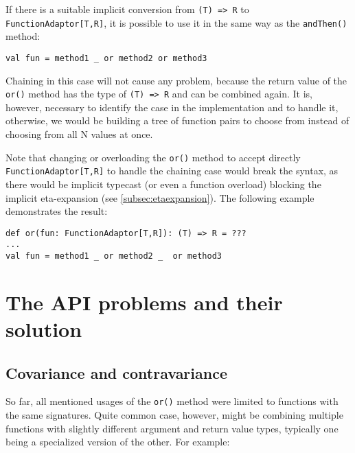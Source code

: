 If there is a suitable implicit conversion from \lstinline|(T) => R| to \lstinline|FunctionAdaptor[T,R]|, it is possible to use it in the same way as the \lstinline|andThen()| method:

\lstset{style=Scala}
\begin{lstlisting}
val fun = method1 _ or method2 or method3
\end{lstlisting}

Chaining in this case will not cause any problem, because the return value of the \lstinline|or()| method has the type of \lstinline|(T) => R| and can be combined again. It is, however, necessary to identify the case in the implementation and to handle it, otherwise, we would be building a tree of function pairs to choose from instead of choosing from all N values at once.

Note that changing or overloading the \lstinline|or()| method to accept directly \lstinline|FunctionAdaptor[T,R]| to handle the chaining case would break the syntax, as there would be implicit typecast (or even a function overload) blocking the implicit eta-expansion (see \ref{subsec:etaexpansion}). The following example demonstrates the result:

\lstset{style=Scala}
\begin{lstlisting}
def or(fun: FunctionAdaptor[T,R]): (T) => R = ???
...
val fun = method1 _ or method2 _  or method3
\end{lstlisting}


\section{The API problems and their solution}

\subsection{Covariance and contravariance}

So far, all mentioned usages of the \lstinline|or()| method were limited to functions with the same signatures. Quite common case, however, might be combining multiple functions with slightly different argument and return value types, typically one being a specialized version of the other. For example:


